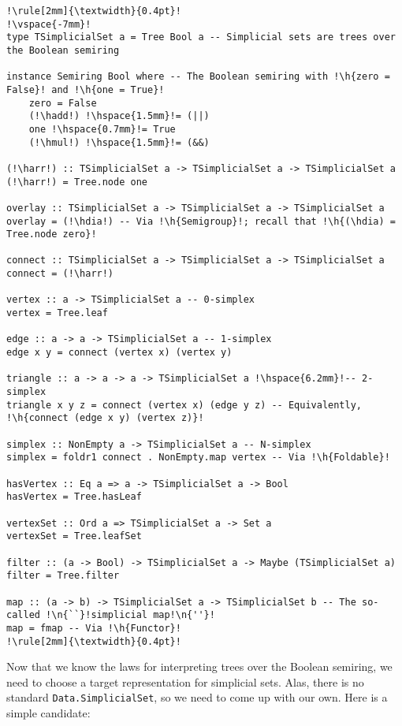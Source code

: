 \documentclass[crc,english]{programming}
\newcommand{\code}[1]{\lstinline[mathescape]|#1|}
\newcommand{\h}[1]{{\itshape\color{grayblue}#1}} %
\newcommand{\n}[1]{{\itshape\color{graygreen}#1}} %
\newcommand{\hadd}{{\large\color{darkblue} $\oplus$}}
\newcommand{\hmul}{{\large\color{darkblue} $\otimes$}}
\newcommand{\hdia}{\,\text{\raisebox{-0.2mm}{\Large\color{darkblue} $\diamond$}}\,}
\newcommand{\harr}{\,\text{\color{darkblue} $\rightarrow$}\,}
\begin{document}
\begin{lstlisting}[float,label=lst-simplicial-set,xleftmargin=0pt,caption={
    A basic API for working with simplicial sets represented by trees.
}]
!\rule[2mm]{\textwidth}{0.4pt}!
!\vspace{-7mm}!
type TSimplicialSet a = Tree Bool a -- Simplicial sets are trees over the Boolean semiring

instance Semiring Bool where -- The Boolean semiring with !\h{zero = False}! and !\h{one = True}!
    zero = False
    (!\hadd!) !\hspace{1.5mm}!= (||)
    one !\hspace{0.7mm}!= True
    (!\hmul!) !\hspace{1.5mm}!= (&&)

(!\harr!) :: TSimplicialSet a -> TSimplicialSet a -> TSimplicialSet a
(!\harr!) = Tree.node one

overlay :: TSimplicialSet a -> TSimplicialSet a -> TSimplicialSet a
overlay = (!\hdia!) -- Via !\h{Semigroup}!; recall that !\h{(\hdia) = Tree.node zero}!

connect :: TSimplicialSet a -> TSimplicialSet a -> TSimplicialSet a
connect = (!\harr!)

vertex :: a -> TSimplicialSet a -- 0-simplex
vertex = Tree.leaf

edge :: a -> a -> TSimplicialSet a -- 1-simplex
edge x y = connect (vertex x) (vertex y)

triangle :: a -> a -> a -> TSimplicialSet a !\hspace{6.2mm}!-- 2-simplex
triangle x y z = connect (vertex x) (edge y z) -- Equivalently, !\h{connect (edge x y) (vertex z)}!

simplex :: NonEmpty a -> TSimplicialSet a -- N-simplex
simplex = foldr1 connect . NonEmpty.map vertex -- Via !\h{Foldable}!

hasVertex :: Eq a => a -> TSimplicialSet a -> Bool
hasVertex = Tree.hasLeaf

vertexSet :: Ord a => TSimplicialSet a -> Set a
vertexSet = Tree.leafSet

filter :: (a -> Bool) -> TSimplicialSet a -> Maybe (TSimplicialSet a)
filter = Tree.filter

map :: (a -> b) -> TSimplicialSet a -> TSimplicialSet b -- The so-called !\n{``}!simplicial map!\n{''}!
map = fmap -- Via !\h{Functor}!
!\rule[2mm]{\textwidth}{0.4pt}!
\end{lstlisting}

\noindent
Now that we know the laws for interpreting trees over the Boolean semiring, we
need to choose a target representation for simplicial sets. Alas, there is no
standard \code{Data.SimplicialS}\code{et}, so we need to come up with our own.
Here is a simple candidate:
\end{document}
